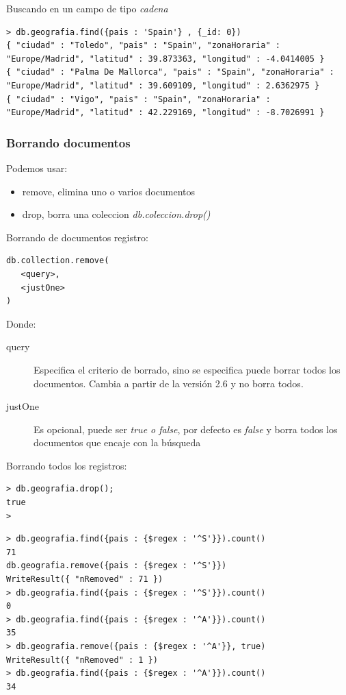 \documentclass[4paper]{article}
\begin{document}
Buscando en un campo de tipo \emph{cadena}
\begin{lstlisting}
> db.geografia.find({pais : 'Spain'} , {_id: 0})
{ "ciudad" : "Toledo", "pais" : "Spain", "zonaHoraria" : "Europe/Madrid", "latitud" : 39.873363, "longitud" : -4.0414005 }
{ "ciudad" : "Palma De Mallorca", "pais" : "Spain", "zonaHoraria" : "Europe/Madrid", "latitud" : 39.609109, "longitud" : 2.6362975 }
{ "ciudad" : "Vigo", "pais" : "Spain", "zonaHoraria" : "Europe/Madrid", "latitud" : 42.229169, "longitud" : -8.7026991 }
\end{lstlisting}


\newpage
\subsubsection{Borrando documentos}
Podemos usar:
\begin{itemize}
\item remove, elimina uno o varios documentos
\item drop, borra una coleccion \emph{db.coleccion.drop()}
\end{itemize}
Borrando de documentos registro:
\begin{lstlisting}
db.collection.remove(
   <query>,
   <justOne>
)
\end{lstlisting}
Donde:
\begin{description}
\item[query] Especifica el criterio de borrado, sino se especifica puede borrar todos los documentos. Cambia a partir de la versión 2.6 y no borra todos.
\item[justOne] Es opcional, puede ser \emph{true o false}, por defecto es \emph{false} y borra todos los documentos que encaje con la búsqueda
\end{description}
Borrando todos los registros:
\begin{lstlisting}
> db.geografia.drop();
true
> 
\end{lstlisting}

\begin{lstlisting}
> db.geografia.find({pais : {$regex : '^S'}}).count()
71
db.geografia.remove({pais : {$regex : '^S'}})
WriteResult({ "nRemoved" : 71 })
> db.geografia.find({pais : {$regex : '^S'}}).count()
0
> db.geografia.find({pais : {$regex : '^A'}}).count()
35
> db.geografia.remove({pais : {$regex : '^A'}}, true)
WriteResult({ "nRemoved" : 1 })
> db.geografia.find({pais : {$regex : '^A'}}).count()
34
\end{lstlisting}
\end{document}
